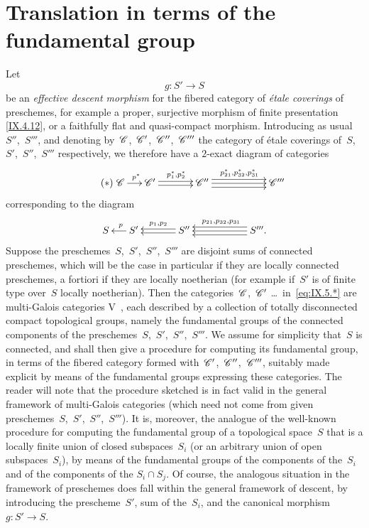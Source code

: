 \section{Translation in terms of the fundamental group}
\label{IX.5}

Let
$$
g\colon S'\to S
$$
be an \emph{effective descent morphism} for the fibered category of
\emph{étale coverings} of preschemes, for example a proper, surjective
morphism of finite presentation \eqref{IX.4.12}, or a faithfully flat
and quasi-compact morphism. Introducing as usual~$S''$,~$S'''$, and
denoting by~$\cal{C}$,~$\cal{C}'$,~$\cal{C}''$,~$\cal{C}'''$ the
category of étale coverings of~$S$,~$S'$,~$S''$,~$S'''$ respectively,
we therefore have a $2$-exact diagram of categories
\begin{equation*}
\label{eq:IX.5.*}
\tag{$*$}
\xymatrix@C=.5cm{
{\cal{C}} \ar[r]^-{~p^*} & {\cal{C}'}
\ar@<2pt>[rr]^{p_1^*,p_2^*} \ar@<-2pt>[rr] && {\cal{C}''}
\ar@<4pt>[rrr]^{p_{21}^*,p_{32}^*,p_{31}^*} \ar[rrr] \ar@<-4pt>[rrr] &&&
{\cal{C}'''}
}
\end{equation*}
corresponding to the diagram
$$
\xymatrix@C=.5cm{ S & \ar[l]_-{~p} S' && \ar@<2pt>[ll] \ar@<-2pt>[ll]_-{p_1,p_2}
S'' &&& \ar@<4pt>[lll] \ar[lll] \ar@<-4pt>[lll]_{p_{21},p_{32},p_{31}} S'''.
}
$$
Suppose
the preschemes~$S$,~$S'$,~$S''$,~$S'''$ are disjoint sums of
connected preschemes, which will be the case in particular if they
are locally connected preschemes, a fortiori if they are locally
noetherian (for example if~$S'$ is of finite type over~$S$ locally
noetherian). Then the categories~$\cal{C}$,~$\cal{C}'$ \ldots\ in~\eqref{eq:IX.5.*}
are multi-Galois categories V~, each described by a
collection of totally disconnected compact topological groups,
namely the fundamental groups of the connected components of the
preschemes~$S$,~$S'$,~$S''$,~$S'''$. We assume for simplicity
that~$S$ is connected, and shall then give a procedure for computing
its fundamental group, in terms of the fibered category formed
with~$\cal{C}'$,~$\cal{C}''$,~$\cal{C}'''$, suitably made explicit by
means of the fundamental groups expressing these categories. The
reader will note that the procedure sketched is in fact valid in the
general framework of multi-Galois categories (which need not come
from given preschemes~$S$,~$S'$,~$S''$,~$S'''$). It is, moreover, the
analogue of the well-known procedure for computing the fundamental
group of a topological space~$S$ that is a locally finite union of
closed subspaces~$S_i$ (or an arbitrary union of open
subspaces~$S_i$), by means of the fundamental groups of the components
of the~$S_i$
and of the components of the $S_i\cap S_j$. Of course, the analogous
situation in the framework of preschemes does fall within the general
framework of descent, by introducing the prescheme~$S'$, sum of
the~$S_i$, and the canonical morphism $g\colon S'\to S$.

